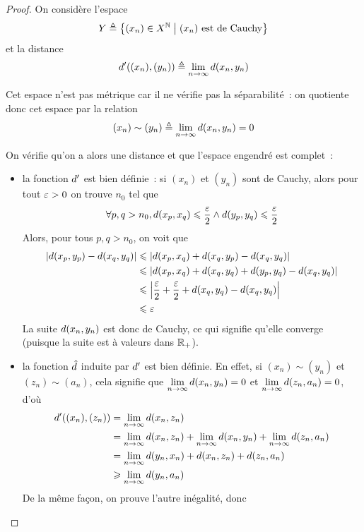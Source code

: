 \begin{proof}
  On considère l'espace
  \[Y \triangleq \left\{ (x_n)\in X^{\mathbb N} \;\middle\vert\; (x_n)\text{ est de Cauchy} \right\}\]
  et la distance
  \[d'((x_n),(y_n)) \triangleq \lim_{n \to \infty} d(x_n,y_n)\]

  Cet espace n'est pas métrique car il ne vérifie pas la séparabilité~: on
  quotiente donc cet espace par la relation
  \[(x_n)\sim (y_n) \triangleq \lim_{n\to\infty} d(x_n,y_n) = 0\]

  On vérifie qu'on a alors une distance et que l'espace engendré est complet~:
  \begin{itemize}
  \item la fonction $d'$ est bien définie~: si $(x_n)$ et $(y_n)$ sont de
    Cauchy, alors pour tout $\varepsilon > 0$ on trouve $n_0$ tel que
    \[\forall p,q > n_0, d(x_p,x_q) \leqslant \dfrac{\varepsilon}{2}
    \land d(y_p,y_q) \leqslant \dfrac{\varepsilon}{2}\]
    Alors, pour tous $p,q > n_0$, on voit que
    \begin{align*}
      |d(x_p,y_p) - d(x_q,y_q)|
      &\leqslant |d(x_p,x_q) + d(x_q,y_p) - d(x_q,y_q)|\\
      &\leqslant |d(x_p,x_q) + d(x_q,y_q) + d(y_p,y_q) -
      d(x_q,y_q)|\\
      &\leqslant \left|\dfrac{\varepsilon}{2} + \dfrac{\varepsilon}{2}
      + d(x_q,y_q) - d(x_q,y_q)\right|\\
      &\leqslant \varepsilon
    \end{align*}
    La suite $d(x_n,y_n)$ est donc de Cauchy, ce qui signifie qu'elle
    converge (puisque la suite est à valeurs dans $\mathbb R_+$).
  \item la fonction $\hat{d}$ induite par $d'$ est bien définie. En
    effet, si $(x_n)\sim (y_n)$ et $(z_n)\sim (a_n)$, cela signifie que
    $\displaystyle\lim_{n\to\infty} d(x_n,y_n) = 0$ et
    $\displaystyle\lim_{n\to\infty} d(z_n,a_n) = 0$, d'où
    \begin{align*}
      d'((x_n),(z_n)) &= \displaystyle\lim_{n \to \infty} d(x_n,z_n)\\
      &= \lim_{n\to \infty} d(x_n,z_n) + \lim_{n\to\infty} d(x_n,y_n) +
      \lim_{n\to \infty} d(z_n,a_n)\\
      &= \lim_{n\to\infty} d(y_n,x_n) + d(x_n,z_n) + d(z_n,a_n)\\
      &\geqslant \lim_{n\to \infty} d(y_n,a_n)
    \end{align*}
    De la même façon, on prouve l'autre inégalité, donc

\end{itemize}
\end{proof}
